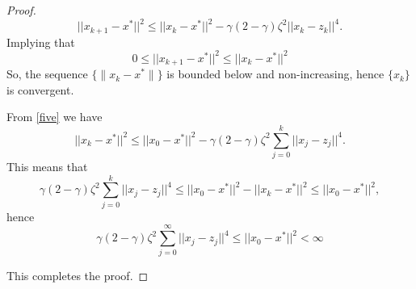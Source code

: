 \documentclass[10pt,a4paper]{amsart}
\begin{document}
\begin{proof}
    \begin{equation}\label{five}
       || x_{k+1}-x^*||^2\leq ||x_k-x^*||^2- \gamma(2-\gamma)\zeta^2 ||x_k-z_k||^4.
    \end{equation}
    Implying that 
    \begin{equation}
       0\leq || x_{k+1}-x^*||^2\leq ||x_k-x^*||^2
    \end{equation}
 So, the sequence $\{\|x_k-x^*\|\}$  is bounded below and non-increasing, hence $\{x_k\}$ is convergent.

From \eqref{five} we have 
\[
   || x_{k}-x^*||^2\leq ||x_0-x^*||^2-\gamma(2-\gamma)\zeta^2\sum_{j=0}^k ||x_j-z_j||^4. 
\]
This means that 
\[
  \gamma(2-\gamma)\zeta^2\sum_{j=0}^k ||x_j-z_j||^4  \leq ||x_0-x^*||^2- || x_{k}-x^*||^2\leq ||x_0-x^*||^2,
\]
hence
\begin{equation}\label{six}
  \gamma(2-\gamma)\zeta^2\sum_{j=0}^{\infty} ||x_j-z_j||^4  \leq ||x_0-x^*||^2<\infty
\end{equation}


 This completes the proof.
\end{proof}
\end{document}
